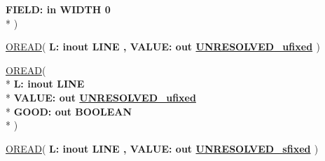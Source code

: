 \begin{DoxyCompactItemize}
  {\bfseries \textcolor{vhdlchar}{ }\textcolor{vhdlchar}{F\+I\+E\+L\+D\+: }\textcolor{stringliteral}{} {\bfseries \textcolor{keywordflow}{in}\textcolor{vhdlchar}{ }\textcolor{vhdlchar}{W\+I\+D\+T\+H}\textcolor{vhdlchar}{ }\textcolor{vhdlchar}{ }\textcolor{vhdlchar}{ } \textcolor{vhdldigit}{0} \textcolor{vhdlchar}{ }}}\\*
   )
\item 
{\bfseries {\bfseries \textcolor{vhdlchar}{ }}} \hyperlink{classfixed__pkg_aee7eef038bb2e610868a9cb8c0c14497}{O\+R\+E\+A\+D}( {\bfseries \textcolor{vhdlchar}{ }\textcolor{vhdlchar}{L\+: }\textcolor{stringliteral}{} {\bfseries \textcolor{keywordflow}{inout}\textcolor{vhdlchar}{ }\textcolor{vhdlchar}{L\+I\+N\+E}\textcolor{vhdlchar}{ }}}{\bfseries ,\textcolor{vhdlchar}{ }\textcolor{vhdlchar}{V\+A\+L\+U\+E\+: }\textcolor{stringliteral}{} {\bfseries \textcolor{keywordflow}{out}\textcolor{vhdlchar}{ }{\bfseries \hyperlink{classfixed__pkg_ae78bc2b36d22f6abeac163955e8a587d}{U\+N\+R\+E\+S\+O\+L\+V\+E\+D\+\_\+ufixed}} \textcolor{vhdlchar}{ }}} )
\item 
{\bfseries {\bfseries \textcolor{vhdlchar}{ }}} \hyperlink{classfixed__pkg_a9ed16f2e9095995d98073cf26843bf3e}{O\+R\+E\+A\+D}( \\*
{\bfseries \textcolor{vhdlchar}{ }\textcolor{vhdlchar}{L\+: }\textcolor{stringliteral}{} {\bfseries \textcolor{keywordflow}{inout}\textcolor{vhdlchar}{ }\textcolor{vhdlchar}{L\+I\+N\+E}\textcolor{vhdlchar}{ }}}\\*
  {\bfseries \textcolor{vhdlchar}{ }\textcolor{vhdlchar}{V\+A\+L\+U\+E\+: }\textcolor{stringliteral}{} {\bfseries \textcolor{keywordflow}{out}\textcolor{vhdlchar}{ }{\bfseries \hyperlink{classfixed__pkg_ae78bc2b36d22f6abeac163955e8a587d}{U\+N\+R\+E\+S\+O\+L\+V\+E\+D\+\_\+ufixed}} \textcolor{vhdlchar}{ }}}\\*
  {\bfseries \textcolor{vhdlchar}{ }\textcolor{vhdlchar}{G\+O\+O\+D\+: }\textcolor{stringliteral}{} {\bfseries \textcolor{keywordflow}{out}\textcolor{vhdlchar}{ }\textcolor{comment}{B\+O\+O\+L\+E\+A\+N}\textcolor{vhdlchar}{ }}}\\*
   )
\item 
{\bfseries {\bfseries \textcolor{vhdlchar}{ }}} \hyperlink{classfixed__pkg_aee7eef038bb2e610868a9cb8c0c14497}{O\+R\+E\+A\+D}( {\bfseries \textcolor{vhdlchar}{ }\textcolor{vhdlchar}{L\+: }\textcolor{stringliteral}{} {\bfseries \textcolor{keywordflow}{inout}\textcolor{vhdlchar}{ }\textcolor{vhdlchar}{L\+I\+N\+E}\textcolor{vhdlchar}{ }}}{\bfseries ,\textcolor{vhdlchar}{ }\textcolor{vhdlchar}{V\+A\+L\+U\+E\+: }\textcolor{stringliteral}{} {\bfseries \textcolor{keywordflow}{out}\textcolor{vhdlchar}{ }{\bfseries \hyperlink{classfixed__pkg_aa723b28a027c3c0f9bca02d75e8df4d6}{U\+N\+R\+E\+S\+O\+L\+V\+E\+D\+\_\+sfixed}} \textcolor{vhdlchar}{ }}} )

\end{DoxyCompactItemize}
